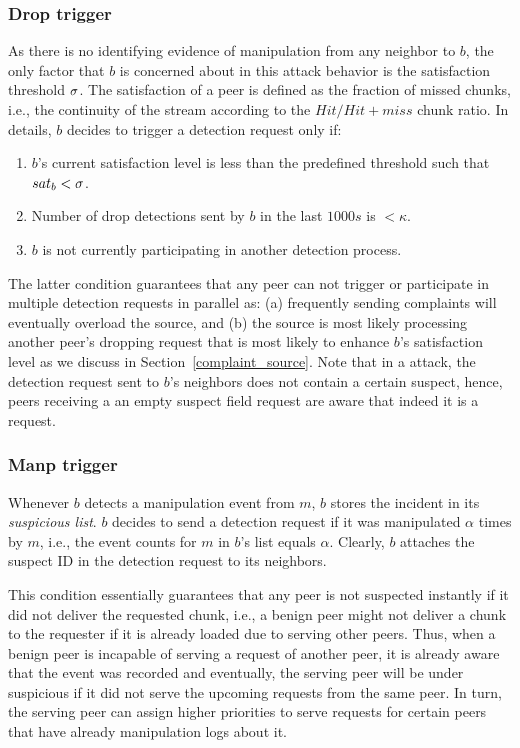 \subsubsection*{Drop trigger}
As there is no identifying evidence of manipulation from any neighbor to $b$, the only factor that $b$ is concerned about in this attack behavior is the satisfaction threshold $\sigma$.
The satisfaction of a peer is defined as the fraction of missed chunks, i.e., the continuity of the stream according to the $Hit/Hit+miss$ chunk ratio.
In details, $b$ decides to trigger a detection request only if:
\begin{enumerate}
 \item $b$'s current satisfaction level is less than the predefined threshold such that $sat_b < \sigma$.
 \item Number of drop detections sent by $b$ in the last $1000s$ is $< \kappa$.
 \item $b$ is not currently participating in another \drop detection process.
\end{enumerate}
The latter condition guarantees that any peer can not trigger or participate in multiple detection requests in parallel as: (a) frequently sending complaints will eventually overload the source,
and (b) the source is most likely processing another peer's dropping request that is most likely to enhance $b$'s satisfaction level as we discuss in Section~\ref{complaint_source}.
Note that in a \drop attack, the detection request sent to $b$'s neighbors does not contain a certain suspect, hence, peers receiving a an empty suspect field request are aware that indeed it is a \drop request.

\subsubsection*{Manp trigger}
Whenever $b$ detects a manipulation event from $m$, $b$ stores the incident in its \textit{suspicious list}.
$b$ decides to send a detection request if it was manipulated $\alpha$ times by $m$, i.e., the event counts for $m$ in $b$'s list equals $\alpha$.
Clearly, $b$ attaches the suspect ID in the detection request to its neighbors.

This condition essentially guarantees that any peer is not suspected instantly if it did not deliver the requested chunk, i.e., a benign peer might not deliver a chunk to the requester if it is already loaded due to serving other peers.
Thus, when a benign peer is incapable of serving a request of another peer, it is already aware that the event was recorded and eventually, the serving peer will be under suspicious if it did not serve the upcoming requests from the same peer.
In turn, the serving peer can assign higher priorities to serve requests for certain peers that have already manipulation logs about it.

